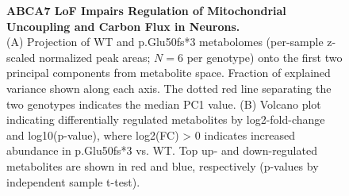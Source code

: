 \begin{figure}[ht]
    \caption{
        \textbf{ABCA7 LoF Impairs Regulation of Mitochondrial Uncoupling and Carbon Flux in Neurons.}\\[1ex]
        (A) Projection of WT and p.Glu50fs*3 metabolomes (per-sample z-scaled normalized peak areas; $N=6$ per genotype) onto the first two principal components from metabolite space. Fraction of explained variance shown along each axis. The dotted red line separating the two genotypes indicates the median PC1 value. 
        (B) Volcano plot indicating differentially regulated metabolites by log2-fold-change and log10(p-value), where log2(FC) > 0 indicates increased abundance in p.Glu50fs*3 vs. WT. Top up- and down-regulated metabolites are shown in red and blue, respectively (p-values by independent sample t-test). 
}
\end{figure}
